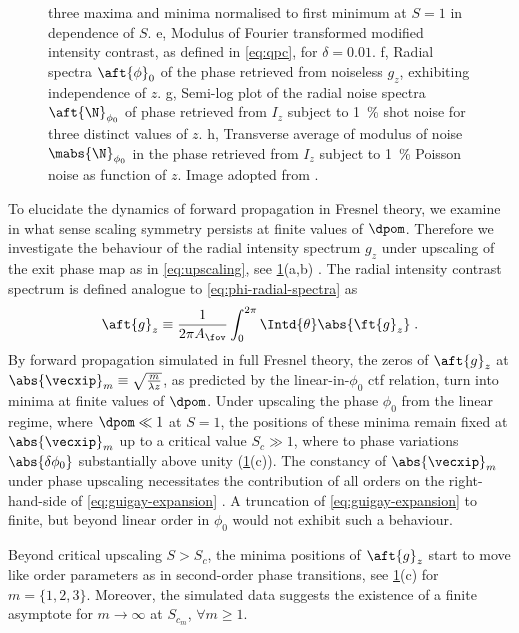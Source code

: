\documentclass[
twoside,
openright,
titlepage,
numbers=noenddot,
headinclude,
fleqn,
a4paper,
footinclude=true,
cleardoublepage=empty,
abstractoff,
BCOR=5mm,
paper=a4,
fontsize=11pt,
british,ngerman,american,
]{scrreprt}
\begin{document}
\begin{figure}
{    three maxima and minima normalised to first minimum at $S=\num{1}$
    in dependence of $S$.  e, Modulus of Fourier transformed modified
    intensity contrast, as defined in \cref{eq:qpc}, for
    $\delta=\num{0.01}$. f, Radial spectra $\aft{\phi}_0$ of the phase
    retrieved from noiseless $g_z$, exhibiting independence of $z$.
    g, Semi-log plot of the radial noise spectra $\aft{\N}_{\phi_0}$
    of phase retrieved from $I_z$ subject to \SI{1}{\percent} shot
    noise for three distinct values of $z$.  h, Transverse average of
    modulus of noise $\mabs{\N}_{\phi_0}$ in the phase retrieved from
    $I_z$ subject to \SI{1}{\percent} Poisson noise as function of
    $z$.  Image adopted from \cite{Hofmann2014}.}
  \label{fig:qp-3}
\end{figure}
To elucidate the dynamics of forward propagation in Fresnel theory, we
examine in what sense scaling symmetry persists at finite values of
$\dpom$.  Therefore we investigate the behaviour of the radial
intensity spectrum  $g_z$ under upscaling of the exit phase map as in
\cref{eq:upscaling}, see \cref{fig:qp-3}(a,b)
\cite{Moosmann2011opex,Hofmann2011opex}.  The radial intensity
contrast spectrum is defined analogue to \cref{eq:phi-radial-spectra}
as
\begin{equation}
  \label{eq:g-radial-spectrum}
  \aft{g}_z\equiv 
  \frac{1}{2\pi A_\fov}\int_0^{2\pi}\Intd{\theta}\abs{\ft{g}_z} \;.
\end{equation}
By forward propagation simulated in full Fresnel theory, the zeros of
$\aft{g}_z$ at $\abs{\vecxip}_m\equiv\sqrt{\frac{m}{\lambda z}}$, as
predicted by the linear-in-$\phi_0$ \ac{ctf} relation, turn into
minima at finite values of $\dpom$.  Under upscaling the phase
$\phi_0$ from the linear regime, where $\dpom\ll 1$ at $S=1$, the
positions of these minima remain fixed at $\abs{\vecxip}_m$ up to a
critical value $S_c\gg 1$, where to phase variations
$\abs{\delta\phi_0}$ substantially above unity (\cref{fig:qp-3}(c)).
The constancy of $\abs{\vecxip}_m$ under phase upscaling necessitates
the contribution of all orders on the right-hand-side of
\cref{eq:guigay-expansion} \cite{Hofmann2011opex}.  A truncation of
\cref{eq:guigay-expansion} to finite, but beyond linear order in
$\phi_0$ would not exhibit such a behaviour.

Beyond critical upscaling $S>S_c$, the minima positions of
$\aft{g}_z$ start to move like order parameters as in second-order
phase transitions, see \cref{fig:qp-3}(c) for $m=\{1,2,3\}$.
Moreover, the simulated data suggests the existence of a finite
asymptote for $m\to\infty$ at $S_{c_m}$, $\forall m\ge1$.
\end{document}
